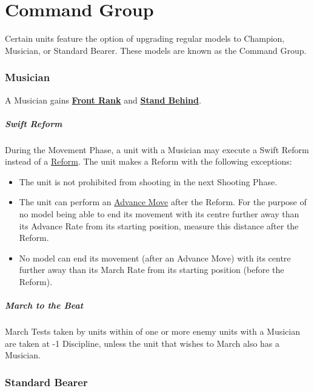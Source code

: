 \part{Command Group}
\label{command_group}

Certain units feature the option of upgrading regular models to Champion, Musician, or Standard Bearer. These models are known as the Command Group.

\section{Musician}
\label{musician}

A Musician gains \hyperref[front_rank]{\textbf{Front Rank}} and \hyperref[stand_behind]{\textbf{Stand Behind}}.

\subsubsection{Swift Reform}
\label{swift_reform}

During the Movement Phase, a unit with a Musician may execute a Swift Reform instead of a \hyperref[reform]{Reform}. The unit makes a Reform with the following exceptions:
\begin{itemize}[label={-}]
\item The unit is not prohibited from shooting in the next Shooting Phase.
\item The unit can perform an \hyperref[advance_move]{Advance Move} after the Reform. For the purpose of no model being able to end its movement with its centre further away than its Advance Rate from its starting position, measure this distance after the Reform.
\item No model can end its movement (after an Advance Move) with its centre further away than its March Rate from its starting position (before the Reform).
\end{itemize}

\subsubsection{March to the Beat}
\label{march_to_the_beat}

March Tests taken by units within  of one or more enemy units with a Musician are taken at -1 Discipline, unless the unit that wishes to March also has a Musician.

\section{Standard Bearer}
\label{standard_bearer}

